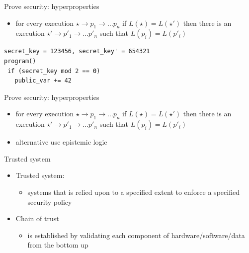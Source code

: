 \documentclass{beamer}
\begin{document}
\begin{frame}[fragile]{Prove security: hyperproperties}
  \begin{itemize}
  \item for every execution $\star \rightarrow p_1 \rightarrow \dots p_n$
    if $L(\star) = L(\star')$  then there is an execution
    $\star' \rightarrow p'_1 \rightarrow \dots p'_n$
  such that $L(p_i) = L(p'_i)$
  \end{itemize}
  \begin{verbatim}
secret_key = 123456, secret_key' = 654321
program()
 if (secret_key mod 2 == 0)
   public_var += 42
  \end{verbatim}
\end{frame}

\begin{frame}[fragile]{Prove security: hyperproperties}
  \begin{itemize}
  \item for every execution $\star \rightarrow p_1 \rightarrow \dots p_n$
    if $L(\star) = L(\star')$  then there is an execution
    $\star' \rightarrow p'_1 \rightarrow \dots p'_n$
  such that $L(p_i) = L(p'_i)$
  \item alternative use epistemic logic
  \end{itemize}
\end{frame}

\begin{frame}{Trusted system}
  \begin{itemize}
  \item Trusted system:
    \begin{itemize}
    \item systems that is relied upon to a specified extent to enforce a specified security policy
    \end{itemize}
  \item Chain of trust
    \begin{itemize}
    \item is established by validating each component of hardware/software/data from the bottom up
    \end{itemize}
  \end{itemize}
\end{frame}
\end{document}
